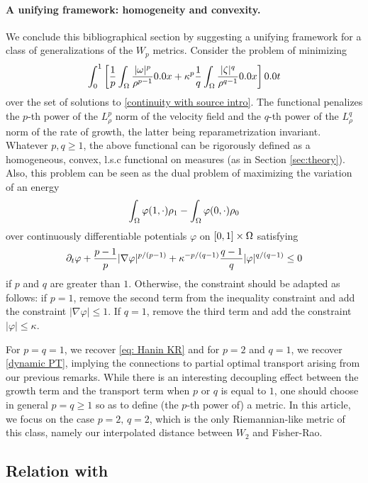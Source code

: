\paragraph{A unifying framework: homogeneity and convexity.}

We conclude this bibliographical section by suggesting a unifying framework for a class of generalizations of the $W_p$ metrics. Consider the problem of minimizing
\[
 \int_0^1 \left[ \frac1p \int_{\Om} \frac{|\M|^p}{\rho^{p-1}} \d x + \kappa^p \frac1q \int_{\Om} \frac{|\zeta|^q}{\rho^{q-1}}\d x \right] \d t
\]
over the set of solutions to  \eqref{continuity with source intro}. The functional penalizes the $p$-th power of the $L^p_{\rho}$ norm of the velocity field and the $q$-th power of the $L^q_{\rho}$ norm of the rate of growth, the latter being reparametrization invariant. Whatever $p,q\geq 1$, the above functional can be rigorously defined as a homogeneous, convex, l.s.c functional on measures (as in Section \ref{sec:theory}). Also, this problem can be seen as the dual problem of maximizing the variation of an energy
\[
\int_{\Omega} \varphi(1,\cdot) \rho_1 - \int_{\Omega} \varphi(0,\cdot) \rho_0
\]
over continuously differentiable potentials $\varphi$ on $[0,1]\times \Omega$ satisfying
\[
\partial_t \varphi + \frac{p-1}{p}|\nabla \varphi |^{p/(p-1)} + \kappa^{-p/(q-1)} \frac{q-1}{q}|\varphi|^{q/(q-1)} \leq 0
\]
if $p$ and $q$ are greater than $1$. Otherwise, the constraint should be adapted as follows: if $p=1$, remove the second term from the inequality constraint and add the constraint $|\nabla \varphi|\leq 1$. If $q=1$, remove the third term and add the constraint $|\varphi| \leq \kappa$. 

For $p=q=1$, we recover \eqref{eq: Hanin KR} and for $p=2$ and $q=1$, we recover \eqref{dynamic PT}, implying the connections to partial optimal transport arising from our previous remarks. While there is an interesting decoupling effect between the growth term and the transport term when $p$ or $q$ is equal to $1$, one should choose in general $p=q\geq1$ so as to define (the $p$-th power of) a metric. In this article, we focus on the case $p=2,\, q=2$, which is the only Riemannian-like metric of this class, namely our interpolated distance between $W_2$ and Fisher-Rao. 


\subsection{Relation with~\cite{new2015kondratyev}}

